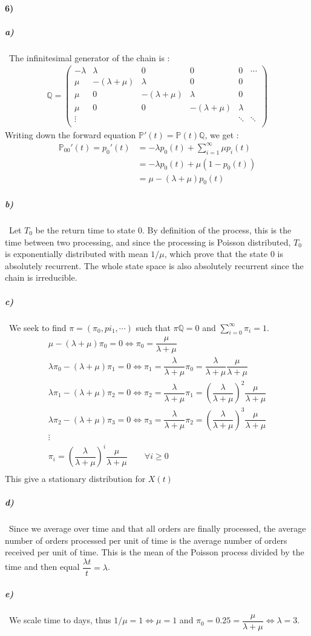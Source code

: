 \documentclass{article}
\begin{document}
\paragraph{6)}
\subparagraph{a)}
\
The infinitesimal generator of the chain is : 
\begin{align*}
\mathbb{Q}=
\begin{pmatrix}
-\lambda & \lambda & 0 & 0 & 0& \cdots \\
\mu & -(\lambda+\mu) & \lambda & 0 & 0 & \\
\mu & 0 & -(\lambda+\mu) & \lambda & 0 &  \\
\mu & 0 & 0 & -(\lambda+\mu) & \lambda &  \\
\vdots &  &  &  & \ddots & \ddots \\
\end{pmatrix}
\end{align*}
Writing down the forward equation $\mathbb{P}'(t)=\mathbb{P}(t)\mathbb{Q}$, we get  : 
\begin{align*} 
\mathbb{P}_{00}'(t)=p_0'(t)&=-\lambda p_0(t) + \sum_{i=1}^{\infty}\mu p_i(t) \\
 &= -\lambda p_0(t) + \mu(1-p_0(t)) \\
 &= \mu -(\lambda+\mu)p_0(t)
\end{align*}
\subparagraph{b)}
\
Let $T_0$ be the return time to state $0$. By definition of the process, this is the time between two processing, and since the processing is Poisson distributed, $T_0$ is exponentially distributed with mean $1/\mu$, which prove that the state $0$ is absolutely recurrent.
The whole state space is also absolutely recurrent since the chain is irreducible.
\subparagraph{c)}
\
We seek to find $\pi=(\pi_0,pi_1,\cdots)$ such that $\pi\mathbb{Q}=0$ and $\sum_{i=0}^{\infty}\pi_i=1$. 
\begin{gather*}
\mu -(\lambda+\mu)\pi_0=0 \iff \pi_0=\dfrac{\mu}{\lambda+\mu} \\
\lambda \pi_0 -(\lambda+\mu)\pi_1=0 \iff \pi_1=\dfrac{\lambda}{\lambda+\mu}\pi_0=\dfrac{\lambda}{\lambda+\mu}\dfrac{\mu}{\lambda+\mu} \\
\lambda \pi_1 -(\lambda+\mu)\pi_2=0 \iff \pi_2=\dfrac{\lambda}{\lambda+\mu}\pi_1=\left(\dfrac{\lambda}{\lambda+\mu}\right)^2\dfrac{\mu}{\lambda+\mu} \\
\lambda \pi_2 -(\lambda+\mu)\pi_3=0 \iff \pi_3=\dfrac{\lambda}{\lambda+\mu}\pi_2=\left(\dfrac{\lambda}{\lambda+\mu}\right)^3\dfrac{\mu}{\lambda+\mu} \\
\vdots \\
\pi_i=\left(\dfrac{\lambda}{\lambda+\mu}\right)^i\dfrac{\mu}{\lambda+\mu}\qquad \forall i \geq 0 \\
\end{gather*}
This give a stationary distribution for $X(t)$
\subparagraph{d)}
\
Since we average over time and that all orders are finally processed, the average number of orders processed per unit of time is the average number of orders received per unit of time. This is the mean of the Poisson process divided by the time and then equal $\dfrac{\lambda t}{t}=\lambda$.
\subparagraph{e)}
\
We scale time to days, thus $1/\mu=1 \iff \mu=1 $ and
$\pi_0=0.25=\dfrac{\mu}{\lambda+\mu} \iff \lambda=3$.
\end{document}

